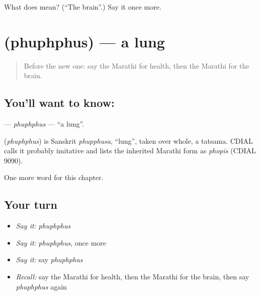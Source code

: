 \begin{tcolorbox}[breakable,colback=teal!4,colframe=teal!35!black,title={Before you move on}]
What does  mean? (\textquotedblleft{}The brain\textquotedblright{}.) Say it once more.
\end{tcolorbox}
\section[\texorpdfstring{\mr{फुफ्फुस} (phuphphus)}{फुफ्फुस (phuphphus)}]{ (phuphphus) — a lung}

\label{lesson:MR-C169-phuphphus}



\begin{quote}
Before the new one: say the Marathi for health, then the Marathi for the brain.
\end{quote}

\subsection*{You'll want to know: }
\textbf{} — \emph{phuphphus} — \textquotedblleft{}a lung\textquotedblright{}.

\begin{cousinweb}
\textbf{} (\emph{phuphphus}) is Sanskrit \emph{phupphusa}, \textquotedblleft{}lung\textquotedblright{}, taken over whole, a tatsama. CDIAL calls it probably imitative and lists the inherited Marathi form as \emph{phopīs} (CDIAL 9090).
\end{cousinweb}

\begin{grammarlens}[title={What you've built}]
One more word for this chapter.
\end{grammarlens}

\subsection*{Your turn}
\begin{itemize}
\raggedright
  \item \emph{Say it:} \emph{phuphphus}
  \item \emph{Say it:} \emph{phuphphus}, once more
  \item \emph{Say it:} say \emph{phuphphus}
  \item \emph{Recall:} say the Marathi for health, then the Marathi for the brain, then say \emph{phuphphus} again
\end{itemize}

